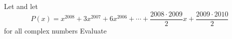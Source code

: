 Let  and let \[ P(x) = x^{2008} + 3x^{2007} + 6x^{2006} + \cdots + \frac{2008 \cdot 2009}{2} x + \frac{2009 \cdot 2010}{2} \] for all complex numbers   Evaluate 